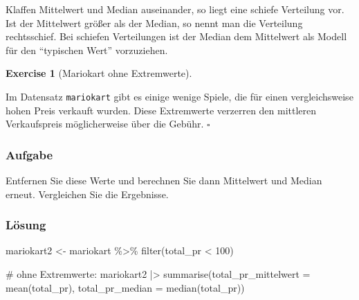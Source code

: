 \documentclass[
  letterpaper,
  DIV=11,
  numbers=noendperiod]{scrartcl}
\newenvironment{Shaded}{\begin{snugshade}}{\end{snugshade}}
\newcommand{\AttributeTok}[1]{\textcolor[rgb]{0.40,0.45,0.13}{#1}}
\newcommand{\CommentTok}[1]{\textcolor[rgb]{0.37,0.37,0.37}{#1}}
\newcommand{\DecValTok}[1]{\textcolor[rgb]{0.68,0.00,0.00}{#1}}
\newcommand{\FunctionTok}[1]{\textcolor[rgb]{0.28,0.35,0.67}{#1}}
\newcommand{\NormalTok}[1]{\textcolor[rgb]{0.00,0.23,0.31}{#1}}
\newcommand{\OtherTok}[1]{\textcolor[rgb]{0.00,0.23,0.31}{#1}}
\newcommand{\SpecialCharTok}[1]{\textcolor[rgb]{0.37,0.37,0.37}{#1}}
\theoremstyle{definition}
\theoremstyle{definition}
\newtheorem{exercise}{Exercise}[section]
\theoremstyle{definition}
\theoremstyle{remark}
\begin{document}
\begin{tcolorbox}[enhanced jigsaw, breakable, toptitle=1mm, colback=white, leftrule=.75mm, colframe=quarto-callout-note-color-frame, colbacktitle=quarto-callout-note-color!10!white, title=\textcolor{quarto-callout-note-color}{\faInfo}\hspace{0.5em}{Note}, toprule=.15mm, opacityback=0, arc=.35mm, coltitle=black, rightrule=.15mm, titlerule=0mm, bottomtitle=1mm, bottomrule=.15mm, left=2mm, opacitybacktitle=0.6]

Klaffen Mittelwert und Median auseinander, so liegt eine schiefe
Verteilung vor. Ist der Mittelwert größer als der Median, so nennt man
die Verteilung rechtsschief. Bei schiefen Verteilungen ist der Median
dem Mittelwert als Modell für den ``typischen Wert'' vorzuziehen.

\end{tcolorbox}

\begin{exercise}[Mariokart ohne
Extremwerte]\protect\hypertarget{exr-mw-no-extrem}{}\label{exr-mw-no-extrem}

Im Datensatz \texttt{mariokart} gibt es einige wenige Spiele, die für
einen vergleichsweise hohen Preis verkauft wurden. Diese Extremwerte
verzerren den mittleren Verkaufspreis möglicherweise über die Gebühr.
\(\square\)

\end{exercise}

\subsubsection{Aufgabe}

Entfernen Sie diese Werte und berechnen Sie dann Mittelwert und Median
erneut. Vergleichen Sie die Ergebnisse.

\subsubsection{Lösung}

\begin{Shaded}
\begin{Highlighting}[]
\NormalTok{mariokart2 }\OtherTok{\textless{}{-}} 
\NormalTok{mariokart }\SpecialCharTok{\%\textgreater{}\%} 
  \FunctionTok{filter}\NormalTok{(total\_pr }\SpecialCharTok{\textless{}} \DecValTok{100}\NormalTok{)}

\CommentTok{\# ohne Extremwerte:}
\NormalTok{mariokart2 }\SpecialCharTok{|\textgreater{}} 
  \FunctionTok{summarise}\NormalTok{(}\AttributeTok{total\_pr\_mittelwert =} \FunctionTok{mean}\NormalTok{(total\_pr),}
            \AttributeTok{total\_pr\_median =} \FunctionTok{median}\NormalTok{(total\_pr))}
\end{Highlighting}
\end{Shaded}
\end{document}
